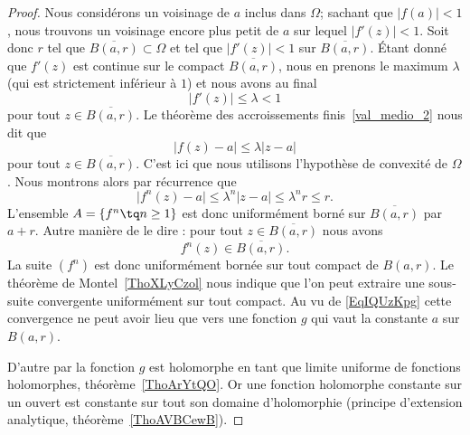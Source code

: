 \begin{proof}
    Nous considérons un voisinage de \( a\) inclus dans \( \Omega\); sachant que \( | f(a) |<1\), nous trouvons un voisinage encore plus petit de \( a\) sur lequel \( | f'(z) |<1\).  Soit donc \( r\) tel que \( \overline{ B(a,r) }\subset \Omega\) et tel que \( | f'(z) |<1\) sur \( \overline{ B(a,r) }\). Étant donné que \( f'(z)\) est continue sur le compact \( \overline{ B(a,r) }\), nous en prenons le maximum \( \lambda\) (qui est strictement inférieur à \( 1\)) et nous avons au final
    \begin{equation}
        | f'(z) |\leq \lambda< 1
    \end{equation}
    pour tout \( z\in \overline{ B(a,r) }\). Le théorème des accroissements finis~\ref{val_medio_2} nous dit que
    \begin{equation}
        \big| f(z)-a \big|\leq \lambda| z-a |
    \end{equation}
    pour tout \( z\in\overline{ B(a,r) }\). C'est ici que nous utilisons l'hypothèse de convexité de \( \Omega\). Nous montrons alors par récurrence que
    \begin{equation}    \label{EqIQUzKpg}
        \big| f^n(z)-a \big|\leq \lambda^n| z-a |\leq \lambda^nr\leq r.
    \end{equation}
    L'ensemble \( A=\{ f^n\tq n\geq 1 \}\) est donc uniformément borné sur \( \overline{ B(a,r) }\) par \( a+r\). Autre manière de le dire : pour tout \( z\in\overline{ B(a,r) }\) nous avons
    \begin{equation}
        f^n(z)\in\overline{ B(a,r) }.
    \end{equation}
    La suite \( (f^n)\) est donc uniformément bornée sur tout compact de \( B(a,r)\). Le théorème de Montel~\ref{ThoXLyCzol} nous indique que l'on peut extraire une sous-suite convergente uniformément sur tout compact. Au vu de \eqref{EqIQUzKpg} cette convergence ne peut avoir lieu que vers une fonction \( g\) qui vaut la constante \( a\) sur \( B(a,r)\).

    D'autre par la fonction \( g\) est holomorphe en tant que limite uniforme de fonctions holomorphes, théorème~\ref{ThoArYtQO}. Or une fonction holomorphe constante sur un ouvert est constante sur tout son domaine d'holomorphie (principe d'extension analytique, théorème~\ref{ThoAVBCewB}).
\end{proof}


